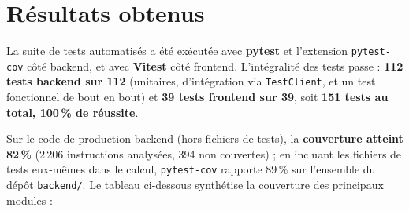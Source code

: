 \documentclass[12pt, a4paper]{report}
\renewcommand{\_}{\origunderscore\allowbreak}
\begin{document}
\section{Résultats obtenus}

La suite de tests automatisés a été exécutée avec \textbf{pytest} et l'extension \texttt{pytest-cov} côté backend, et avec \textbf{Vitest} côté frontend. L'intégralité des tests passe : \textbf{112 tests backend sur 112} (unitaires, d'intégration via \texttt{TestClient}, et un test fonctionnel de bout en bout) et \textbf{39 tests frontend sur 39}, soit \textbf{151 tests au total, 100\,\% de réussite}.

\noindent Sur le code de production backend (hors fichiers de tests), la \textbf{couverture atteint 82\,\%} (2\,206 instructions analysées, 394 non couvertes) ; en incluant les fichiers de tests eux-mêmes dans le calcul, \texttt{pytest-cov} rapporte 89\,\% sur l'ensemble du dépôt \texttt{backend/}. Le tableau ci-dessous synthétise la couverture des principaux modules :

\vspace{5pt}
\end{document}
